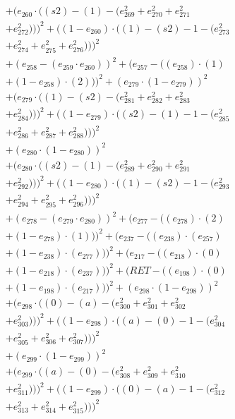 \documentclass[10pt, a4paper]{article}
\begin{document}
\begin{small}
\begin{align*}
& + (e_{260}  \cdot  ((s2) - (1) - (e_{269}^{2} + e_{270}^{2} + e_{271}^{2} \\
& + e_{272}^{2})))^{2} + ((1 - e_{260})  \cdot  ((1) - (s2) - 1 - (e_{273}^{2} \\
& + e_{274}^{2} + e_{275}^{2} + e_{276}^{2})))^{2} \\
& + (e_{258} - (e_{259}  \cdot  e_{260}))^{2} + (e_{257} - ((e_{258})  \cdot  (1) \\
& + (1 - e_{258})  \cdot  (2)))^{2} + (e_{279}  \cdot  (1 - e_{279}))^{2} \\
& + (e_{279}  \cdot  ((1) - (s2) - (e_{281}^{2} + e_{282}^{2} + e_{283}^{2} \\
& + e_{284}^{2})))^{2} + ((1 - e_{279})  \cdot  ((s2) - (1) - 1 - (e_{285}^{2} \\
& + e_{286}^{2} + e_{287}^{2} + e_{288}^{2})))^{2} \\
& + (e_{280}  \cdot  (1 - e_{280}))^{2} \\
& + (e_{280}  \cdot  ((s2) - (1) - (e_{289}^{2} + e_{290}^{2} + e_{291}^{2} \\
& + e_{292}^{2})))^{2} + ((1 - e_{280})  \cdot  ((1) - (s2) - 1 - (e_{293}^{2} \\
& + e_{294}^{2} + e_{295}^{2} + e_{296}^{2})))^{2} \\
& + (e_{278} - (e_{279}  \cdot  e_{280}))^{2} + (e_{277} - ((e_{278})  \cdot  (2) \\
& + (1 - e_{278})  \cdot  (1)))^{2} + (e_{237} - ((e_{238})  \cdot  (e_{257}) \\
& + (1 - e_{238})  \cdot  (e_{277})))^{2} + (e_{217} - ((e_{218})  \cdot  (0) \\
& + (1 - e_{218})  \cdot  (e_{237})))^{2} + (RET - ((e_{198})  \cdot  (0) \\
& + (1 - e_{198})  \cdot  (e_{217})))^{2} + (e_{298}  \cdot  (1 - e_{298}))^{2} \\
& + (e_{298}  \cdot  ((0) - (a) - (e_{300}^{2} + e_{301}^{2} + e_{302}^{2} \\
& + e_{303}^{2})))^{2} + ((1 - e_{298})  \cdot  ((a) - (0) - 1 - (e_{304}^{2} \\
& + e_{305}^{2} + e_{306}^{2} + e_{307}^{2})))^{2} \\
& + (e_{299}  \cdot  (1 - e_{299}))^{2} \\
& + (e_{299}  \cdot  ((a) - (0) - (e_{308}^{2} + e_{309}^{2} + e_{310}^{2} \\
& + e_{311}^{2})))^{2} + ((1 - e_{299})  \cdot  ((0) - (a) - 1 - (e_{312}^{2} \\
& + e_{313}^{2} + e_{314}^{2} + e_{315}^{2})))^{2} \\

\end{align*}
\end{small}
\end{document}
